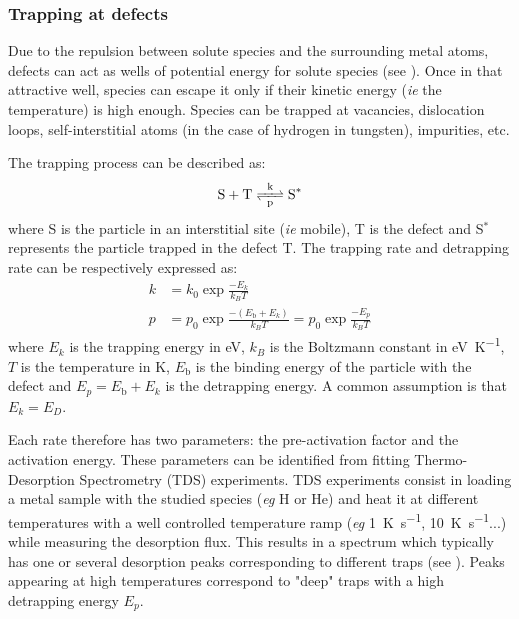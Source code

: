 \subsubsection{Trapping at defects}

Due to the repulsion between solute species and the surrounding metal atoms, defects can act as wells of potential energy for solute species (see ).
Once in that attractive well, species can escape it only if their kinetic energy (\textit{ie} the temperature) is high enough.
Species can be trapped at vacancies, dislocation loops, self-interstitial atoms (in the case of hydrogen in tungsten), impurities, etc.

The trapping process can be described as:
\begin{equation}
    \ce{S + T <=>[k][p] S^*}
\end{equation}
where S is the particle in an interstitial site (\textit{ie} mobile), T is the defect and S$^*$ represents the particle trapped in the defect T.
The trapping rate and detrapping rate can be respectively expressed as:
\begin{align}
    k &= k_0 \exp{\frac{-E_k}{k_B T}} \\
    p &= p_0 \exp{\frac{-(E_\mathrm{b} + E_k)}{k_B T}} = p_0 \exp{\frac{-E_p}{k_B T}}
\end{align}
where $E_k$ is the trapping energy in \si{eV}, $k_B$ is the Boltzmann constant in \si{eV.K^{-1}}, $T$ is the temperature in \si{K}, $E_\mathrm{b}$ is the binding energy of the particle with the defect and $E_p = E_\mathrm{b} + E_k$ is the detrapping energy.
A common assumption is that $E_k = E_D$.

Each rate therefore has two parameters: the pre-activation factor and the activation energy.
These parameters can be identified from fitting Thermo-Desorption Spectrometry (TDS) experiments.
TDS experiments consist in loading a metal sample with the studied species (\textit{eg} H or He) and heat it at different temperatures with a well controlled temperature ramp (\textit{eg} \SI{1}{K.s^{-1}}, \SI{10}{K.s^{-1}}...) while measuring the desorption flux.
This results in a spectrum which typically has one or several desorption peaks corresponding to different traps (see ).
Peaks appearing at high temperatures correspond to "deep" traps with a high detrapping energy $E_p$.


